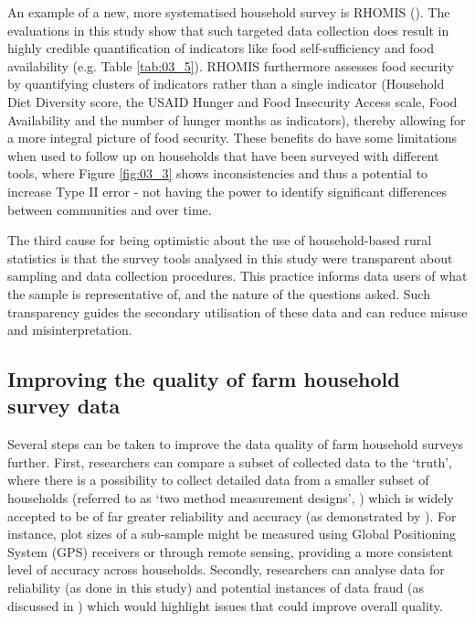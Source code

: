 An example of a new, more systematised household survey is RHOMIS (\citealp{Hammond2017225}). The evaluations in this study show that such targeted data collection does result in highly credible quantification of indicators like food self-sufficiency and food availability (e.g. Table \ref{tab:03_5}). RHOMIS furthermore assesses food security by quantifying clusters of indicators rather than a single indicator (Household Diet Diversity score, the USAID Hunger and Food Insecurity Access scale, Food Availability and the number of hunger months as indicators), thereby allowing for a more integral picture of food security. These benefits do have some limitations when used to follow up on households that have been surveyed with different tools, where Figure \ref{fig:03_3} shows inconsistencies and thus a potential to increase Type II error - not having the power to identify significant differences between communities and over time.

The third cause for being optimistic about the use of household-based rural statistics is that the survey tools analysed in this study were transparent about sampling and data collection procedures. This practice informs data users of what the sample is representative of, and the nature of the questions asked. Such transparency guides the secondary utilisation of these data and can reduce misuse and misinterpretation.

\subsection{Improving the quality of farm household survey data}

Several steps can be taken to improve the data quality of farm household surveys further. First, researchers can compare a subset of collected data to the `truth', where there is a possibility to collect detailed data from a smaller subset of households (referred to as `two method measurement designs', \citealp{Little2013}) which is widely accepted to be of far greater reliability and accuracy (as demonstrated by \citealp{Giller2011}). For instance, plot sizes of a sub-sample might be measured using Global Positioning System (GPS) receivers or through remote sensing, providing a more consistent level of accuracy across households. Secondly, researchers can analyse data for reliability (as done in this study) and potential instances of data fraud (as discussed in \citealp{Finn2017}) which would highlight issues that could improve overall quality.

